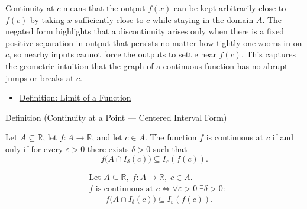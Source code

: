 \begin{remark*}[Interpretation]
Continuity at $c$ means that the output $f(x)$ can be kept arbitrarily close to $f(c)$ by taking $x$ sufficiently close to $c$ while staying in the domain $A$. The negated form highlights that a discontinuity arises only when there is a fixed positive separation in output that persists no matter how tightly one zooms in on $c$, so nearby inputs cannot force the outputs to settle near $f(c)$. This captures the geometric intuition that the graph of a continuous function has no abrupt jumps or breaks at $c$.
\end{remark*}

\begin{dependencies}
\begin{itemize}
  \item \hyperref[def:limit-function]{Definition: Limit of a Function}
\end{itemize}
\end{dependencies}


\begin{definitionbox}{Definition (Continuity at a Point --- Centered Interval Form)}
\begin{definition}
\label{def:continuous-at-point-nbhd}
Let $A \subseteq \mathbb{R}$, let $f : A \to \mathbb{R}$, and let $c \in A$. The function $f$ is continuous at $c$ if and only if for every $\varepsilon > 0$ there exists $\delta > 0$ such that
\[
f\bigl(A \cap I_\delta(c)\bigr) \subseteq I_\varepsilon(f(c)).
\]
\end{definition}
\end{definitionbox}

\begin{remark*}
\[
\begin{aligned}
&\text{Let } A \subseteq \mathbb{R},\; f:A \to \mathbb{R},\; c \in A.\\
&f \text{ is continuous at } c \Longleftrightarrow \forall \varepsilon > 0\; \exists \delta > 0:\\
&\qquad f\bigl(A \cap I_\delta(c)\bigr) \subseteq I_\varepsilon(f(c)).
\end{aligned}
\]
\end{remark*}

